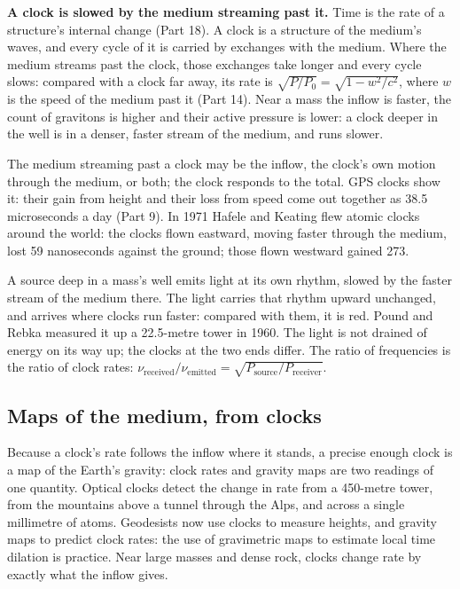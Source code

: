 \documentclass[11pt,a4paper]{article}
\begin{document}
\begin{hypbar}
\textbf{A clock is slowed by the medium streaming past it.} Time is the rate of a structure's internal change (Part 18).\footnotemark{} A clock is a structure of the medium's waves, and every cycle of it is carried by exchanges with the medium. Where the medium streams past the clock, those exchanges take longer and every cycle slows: compared with a clock far away, its rate is $\sqrt{P/P_0} = \sqrt{1 - w^2/c^2}$, where $w$ is the speed of the medium past it (Part 14).\footnotemark{} Near a mass the inflow is faster, the count of gravitons is higher and their active pressure is lower: a clock deeper in the well is in a denser, faster stream of the medium, and runs slower.
\end{hypbar}
\addtocounter{footnote}{-1}

 The medium streaming past a clock may be the inflow, the clock's own motion through the medium, or both; the clock responds to the total. GPS clocks show it: their gain from height and their loss from speed come out together as 38.5 microseconds a day (Part 9). In 1971 Hafele and Keating flew atomic clocks around the world: the clocks flown eastward, moving faster through the medium, lost 59 nanoseconds against the ground; those flown westward gained 273.

 A source deep in a mass's well emits light at its own rhythm, slowed by the faster stream of the medium there. The light carries that rhythm upward unchanged, and arrives where clocks run faster: compared with them, it is red. Pound and Rebka measured it up a 22.5-metre tower in 1960. The light is not drained of energy on its way up; the clocks at the two ends differ. The ratio of frequencies is the ratio of clock rates: $\nu_{\text{received}}/\nu_{\text{emitted}} = \sqrt{P_{\text{source}}/P_{\text{receiver}}}$.

\subsection{Maps of the medium, from clocks}

 Because a clock's rate follows the inflow where it stands, a precise enough clock is a map of the Earth's gravity: clock rates and gravity maps are two readings of one quantity. Optical clocks detect the change in rate from a 450-metre tower, from the mountains above a tunnel through the Alps, and across a single millimetre of atoms. Geodesists now use clocks to measure heights, and gravity maps to predict clock rates: the use of gravimetric maps to estimate local time dilation is practice. Near large masses and dense rock, clocks change rate by exactly what the inflow gives.
\end{document}
